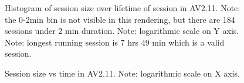 \documentclass{article}
\begin{document}
\begin{figure}[H]
        \caption{\label{FIGURE-AV211SessionSize} Histogram of session size over lifetime of session in AV2.11. Note: the 0-2min bin is not visible in this rendering, but there are 184 sessions under 2 min duration. Note: logarithmic scale on Y axis. Note: longest running session is 7 hrs 49 min which is a valid session.}
\end{figure}

\begin{figure}[H]
        \caption{\label{FIGURE-AV211SizeVsTime} Session size vs time in AV2.11. Note: logarithmic scale on X axis.}
\end{figure}
\end{document}
